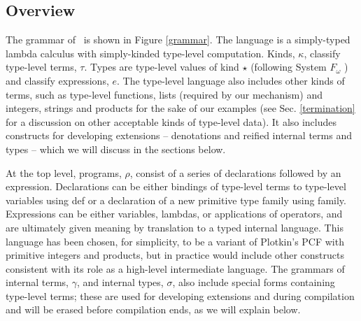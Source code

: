 \documentclass{llncs}
\begin{document}
\subsection{Overview}
The grammar of \atlam~is shown in Figure \ref{grammar}. The language is a simply-typed lambda calculus with simply-kinded type-level computation. Kinds, $\kappa$, classify type-level terms, $\tau$. 
Types are type-level values of kind $\star$ (following System $F_{\omega}$ \cite{fomega}) and classify expressions, $e$. The type-level language also includes other kinds of terms, such as type-level functions, lists (required by our mechanism) and integers, strings and products for the sake of our examples (see Sec. \ref{termination} for a discussion on other acceptable kinds of type-level data). It also includes constructs for developing extensions -- denotations and reified internal terms and types -- which we will discuss in the sections below.

At the top level, programs, $\rho$, consist of a series of declarations followed by an expression. Declarations can be either bindings of type-level terms to type-level variables using \textsf{def} or a declaration of a new primitive type family using \textsf{family}. Expressions can be either variables, lambdas, or applications of operators, and are ultimately given meaning by translation to a typed internal language. This language has been chosen, for simplicity, to be a variant of Plotkin's PCF with primitive integers and products, but in practice would include other constructs consistent with its role as a high-level intermediate language. The grammars of internal terms, $\gamma$, and internal types, $\sigma$, also include special forms containing type-level terms; these are used for developing extensions and during compilation and will be erased before compilation ends, as we will explain below.
\end{document}
